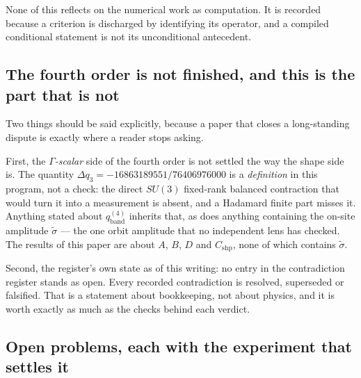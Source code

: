 \documentclass[11pt]{article}
\theoremstyle{definition}
\theoremstyle{remark}
\begin{document}
None of this reflects on the numerical work as computation. It is recorded
because a criterion is discharged by identifying its operator, and a compiled
conditional statement is not its unconditional antecedent.

\subsection{The fourth order is not finished, and this is the part that is not}

Two things should be said explicitly, because a paper that closes a
long-standing dispute is exactly where a reader stops asking.

First, the \emph{$\Gamma$-scalar} side of the fourth order is not settled the
way the shape side is. The quantity $\Delta q_3=-16863189551/76406976000$ is a
\emph{definition} in this program, not a check: the direct $SU(3)$ fixed-rank
balanced contraction that would turn it into a measurement is absent, and a
Hadamard finite part misses it. Anything stated about $q_{\mathrm{band}}^{(4)}$
inherits that, as does anything containing the on-site amplitude $\tilde\sigma$
--- the one orbit amplitude that no independent lens has checked. The results
of this paper are about $A$, $B$, $D$ and $C_{\mathrm{shp}}$, none of which
contains $\tilde\sigma$.

Second, the register's own state as of this writing: no entry in the
contradiction register stands as open. Every recorded contradiction is
resolved, superseded or falsified. That is a statement about bookkeeping, not
about physics, and it is worth exactly as much as the checks behind each
verdict.

\subsection{Open problems, each with the experiment that settles it}
\end{document}

